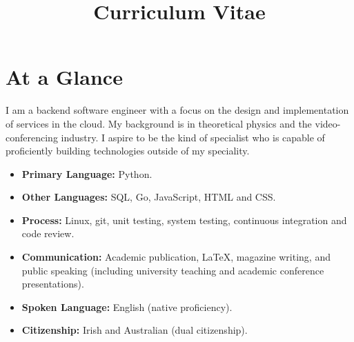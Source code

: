 \documentclass[11pt,a4paper,sans]{moderncv}        %
\title{Curriculum Vitae}
\begin{document}
\makecvtitle

\vspace{-0.9cm}

\section{At a Glance}
\small{I am a backend software engineer with a focus on the design and implementation of services in the cloud. My background is in theoretical physics and the video-conferencing industry. I aspire to be the kind of specialist who is capable of proficiently building technologies outside of my speciality.}

\begin{itemize}
\item{\small{\textbf{Primary Language:} Python.}}
\item{\small{\textbf{Other Languages:} SQL, Go, JavaScript, HTML and CSS.}}
\item{\small{\textbf{Process:} Linux, git, unit testing, system testing, continuous integration and code review.}}
\item{\small{\textbf{Communication:} Academic publication, \LaTeX, magazine writing,  and public speaking (including university teaching and academic conference presentations).}}
\item {\small{\textbf{Spoken Language:} English (native proficiency).}}
\item {\small{\textbf{Citizenship:} Irish and Australian (dual citizenship).}}
\end{itemize}

\vspace{5pt}
\end{document}
